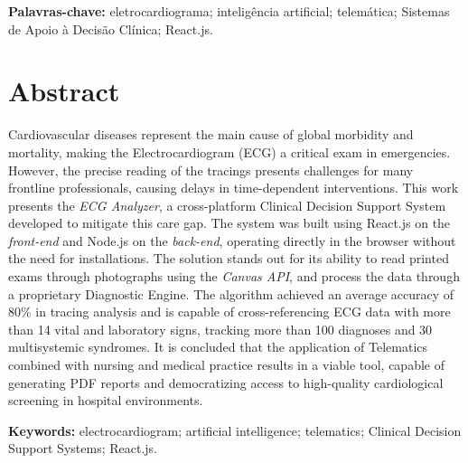 \documentclass[portuguese,12pt,oneside,a4paper]{book}
\begin{document}
\noindent \textbf{Palavras-chave:} eletrocardiograma; inteligência artificial; telemática; Sistemas de Apoio à Decisão Clínica; React.js.

\pagebreak

\chapter*{Abstract}
Cardiovascular diseases represent the main cause of global morbidity and mortality, making the Electrocardiogram (ECG) a critical exam in emergencies. However, the precise reading of the tracings presents challenges for many frontline professionals, causing delays in time-dependent interventions. This work presents the \textit{ECG Analyzer}, a cross-platform Clinical Decision Support System developed to mitigate this care gap. The system was built using React.js on the \textit{front-end} and Node.js on the \textit{back-end}, operating directly in the browser without the need for installations. The solution stands out for its ability to read printed exams through photographs using the \textit{Canvas API}, and process the data through a proprietary Diagnostic Engine. The algorithm achieved an average accuracy of 80\% in tracing analysis and is capable of cross-referencing ECG data with more than 14 vital and laboratory signs, tracking more than 100 diagnoses and 30 multisystemic syndromes. It is concluded that the application of Telematics combined with nursing and medical practice results in a viable tool, capable of generating PDF reports and democratizing access to high-quality cardiological screening in hospital environments.

\noindent \textbf{Keywords:} electrocardiogram; artificial intelligence; telematics; Clinical Decision Support Systems; React.js.

\tableofcontents    %

\end{document}
